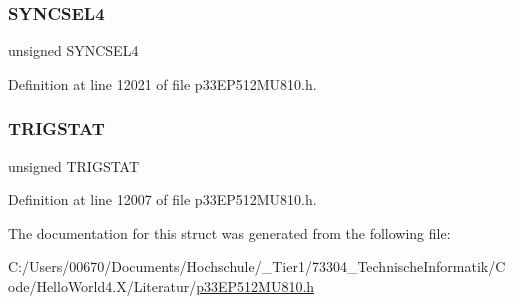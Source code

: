 \mbox{\label{structtag_o_c13_c_o_n2_b_i_t_s_a0cd5bbe196c7974953909d27a6307bb7}} 
\subsubsection{\texorpdfstring{S\+Y\+N\+C\+S\+E\+L4}{SYNCSEL4}}
{\footnotesize\ttfamily unsigned S\+Y\+N\+C\+S\+E\+L4}



Definition at line 12021 of file p33\+E\+P512\+M\+U810.\+h.

\mbox{\label{structtag_o_c13_c_o_n2_b_i_t_s_ab379549de54ac93ad4aa73686c34cb7c}} 
\subsubsection{\texorpdfstring{T\+R\+I\+G\+S\+T\+AT}{TRIGSTAT}}
{\footnotesize\ttfamily unsigned T\+R\+I\+G\+S\+T\+AT}



Definition at line 12007 of file p33\+E\+P512\+M\+U810.\+h.



The documentation for this struct was generated from the following file\+:\begin{DoxyCompactItemize}
\item 
C\+:/\+Users/00670/\+Documents/\+Hochschule/\+\_\+\+Tier1/73304\+\_\+\+Technische\+Informatik/\+Code/\+Hello\+World4.\+X/\+Literatur/\hyperlink{p33_e_p512_m_u810_8h}{p33\+E\+P512\+M\+U810.\+h}\end{DoxyCompactItemize}

